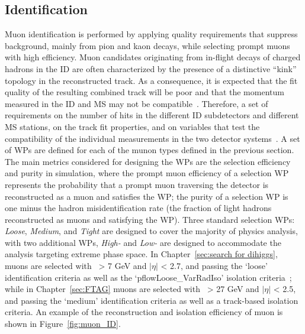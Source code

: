 \subsection{Identification}
Muon identification is performed by applying quality requirements that suppress background, 
mainly from pion and kaon decays, while selecting prompt muons with high efficiency.
Muon candidates originating from in-flight decays of charged hadrons in the ID 
are often characterized by the presence of a distinctive “kink” topology 
in the reconstructed track. 
As a consequence, it is expected that the fit quality of the resulting combined track 
will be poor and that the momentum measured in the ID and MS may not be compatible~\cite{PERF-2015-10}. 
Therefore, a set of requirements on the
number of hits in the different ID subdetectors and different
MS stations, on the track fit properties, 
and on variables that test the compatibility of the individual measurements 
in the two detector systems~\cite{CERN-EP-2020-199}.
A set of WPs are defined for each of the munon types defined in the 
previous section. 
The main metrics considered for designing the WPs are 
the selection efficiency and purity in simulation,
where the prompt muon efficiency of a selection WP 
represents the probability that a prompt muon traversing the detector 
is reconstructed as a muon and satisfies the WP; the purity
of a selection WP is one minus the hadron misidentification
rate (the fraction of light hadrons reconstructed as muons 
and satisfying the WP).
Three standard selection WPs: \textit{Loose},
\textit{Medium}, and \textit{Tight} are designed to 
cover the majority of physics analysis, with 
two additional WPs, \textit{High-\pt} and \textit{Low-\pt}
are designed to accommodate the analysis targeting extreme 
phase space. 
In Chapter~\ref{sec:search for dihiggs}, muons are selected
with \pt\ > 7 GeV and $|\eta|$ < 2.7, and passing the `loose' 
identification criteria as well as the `pflowLoose\_VarRadIso' 
isolation criteria~\cite{MuonWP};
while in Chapter~\ref{sec:FTAG} muons are selected
with \pt\ > 27 GeV and $|\eta|$ < 2.5, and passing the `medium' 
identification criteria as well as a track-based isolation criteria.
An example of the reconstruction and isolation efficiency of muon is 
shown in Figure~\ref{fig:muon_ID}.
